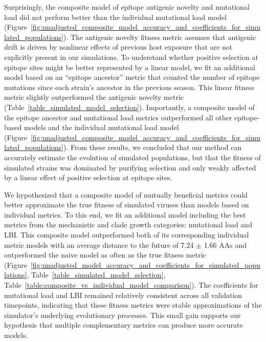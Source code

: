 Surprisingly, the composite model of epitope antigenic novelty and mutational load did not perform better than the individual mutational load model (Figure~\ref{fig:unadjusted_composite_model_accuracy_and_coefficients_for_simulated_populations}).
The antigenic novelty fitness metric assumes that antigenic drift is driven by nonlinear effects of previous host exposure \citep{Luksza:2014hj} that are not explicitly present in our simulations.
To understand whether positive selection at epitope sites might be better represented by a linear model, we fit an additional model based on an ``epitope ancestor'' metric that counted the number of epitope mutations since each strain's ancestor in the previous season.
This linear fitness metric slightly outperformed the antigenic novelty metric (Table~\ref{table_simulated_model_selection}).
Importantly, a composite model of the epitope ancestor and mutational load metrics outperformed all other epitope-based models and the individual mutational load model (Figure~\ref{fig:unadjusted_composite_model_accuracy_and_coefficients_for_simulated_populations}).
From these results, we concluded that our method can accurately estimate the evolution of simulated populations, but that the fitness of simulated strains was dominated by purifying selection and only weakly affected by a linear effect of positive selection at epitope sites.

We hypothesized that a composite model of mutually beneficial metrics could better approximate the true fitness of simulated viruses than models based on individual metrics.
To this end, we fit an additional model including the best metrics from the mechanistic and clade growth categories: mutational load and LBI.
This composite model outperformed both of its corresponding individual metric models with an average distance to the future of 7.24 $\pm$ 1.66 AAs and outperformed the naive model as often as the true fitness metric (Figure~\ref{fig:unadjusted_model_accuracy_and_coefficients_for_simulated_populations}, Table~\ref{table_simulated_model_selection}, Table~\ref{table:composite_vs_individual_model_comparison}).
The coefficients for mutational load and LBI remained relatively consistent across all validation timepoints, indicating that these fitness metrics were stable approximations of the simulator's underlying evolutionary processes.
This small gain supports our hypothesis that multiple complementary metrics can produce more accurate models.

